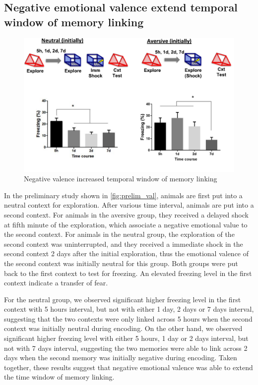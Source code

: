 \documentclass[master.tex]{subfiles}
\begin{document}
\subsection*{Negative emotional valence extend temporal window of memory linking}

\begin{figure}
  \centering \includegraphics[scale = .4]{Figures/val_retro_prelim.pdf}
  \caption{\footnotesize Negative valence increased temporal window of memory
    linking}
  \label{fig:prelim_val}
\end{figure}

In the preliminary study shown in \autoref{fig:prelim_val}, animals are first
put into a neutral context for exploration. After various time interval, animals
are put into a second context. For animals in the aversive group, they received
a delayed shock at fifth minute of the exploration, which associate a negative
emotional value to the second context. For animals in the neutral group, the
exploration of the second context was uninterrupted, and they received a
immediate shock in the second context 2 days after the initial exploration, thus
the emotional valence of the second context was initially neutral for this
group. Both groups were put back to the first context to test for freezing. An
elevated freezing level in the first context indicate a transfer of fear.

For the neutral group, we observed significant higher freezing level in the
first context with 5 hours interval, but not with either 1 day, 2 days or 7 days
interval, suggesting that the two contexts were only linked across 5 hours when
the second context was initially neutral during encoding. On the other hand, we
observed significant higher freezing level with either 5 hours, 1 day or 2 days
interval, but not with 7 days interval, suggesting the two memories were able to
link across 2 days when the second memory was initially negative during
encoding. Taken together, these results suggest that negative emotional valence
was able to extend the time window of memory linking.
\end{document}
